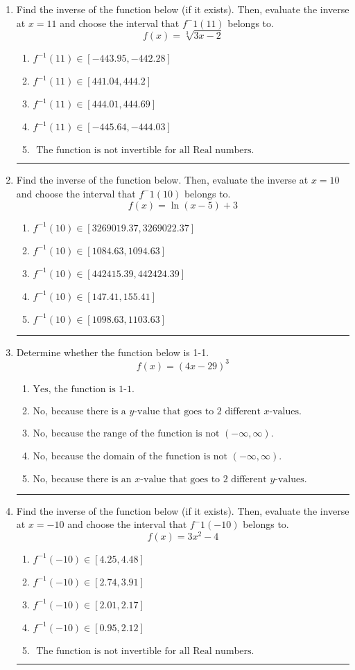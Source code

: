 \documentclass[14pt]{extbook}
\newcommand{\litem}[1]{\item#1\hspace*{-1cm}\rule{\textwidth}{0.4pt}}
\begin{document}
\begin{enumerate}
{\begin{enumerate}[label=\Alph*.]
\end{enumerate} }
\litem{
Find the inverse of the function below (if it exists). Then, evaluate the inverse at $x = 11$ and choose the interval that $f^-1(11)$ belongs to.\[ f(x) = \sqrt[3]{3 x - 2} \]\begin{enumerate}[label=\Alph*.]
\item \( f^{-1}(11) \in [-443.95, -442.28] \)
\item \( f^{-1}(11) \in [441.04, 444.2] \)
\item \( f^{-1}(11) \in [444.01, 444.69] \)
\item \( f^{-1}(11) \in [-445.64, -444.03] \)
\item \( \text{ The function is not invertible for all Real numbers. } \)

\end{enumerate} }
\litem{
Find the inverse of the function below. Then, evaluate the inverse at $x = 10$ and choose the interval that $f^-1(10)$ belongs to.\[ f(x) = \ln{(x-5)}+3 \]\begin{enumerate}[label=\Alph*.]
\item \( f^{-1}(10) \in [3269019.37, 3269022.37] \)
\item \( f^{-1}(10) \in [1084.63, 1094.63] \)
\item \( f^{-1}(10) \in [442415.39, 442424.39] \)
\item \( f^{-1}(10) \in [147.41, 155.41] \)
\item \( f^{-1}(10) \in [1098.63, 1103.63] \)

\end{enumerate} }
\litem{
Determine whether the function below is 1-1.\[ f(x) = (4 x - 29)^3 \]\begin{enumerate}[label=\Alph*.]
\item \( \text{Yes, the function is 1-1.} \)
\item \( \text{No, because there is a $y$-value that goes to 2 different $x$-values.} \)
\item \( \text{No, because the range of the function is not $(-\infty, \infty)$.} \)
\item \( \text{No, because the domain of the function is not $(-\infty, \infty)$.} \)
\item \( \text{No, because there is an $x$-value that goes to 2 different $y$-values.} \)

\end{enumerate} }
\litem{
Find the inverse of the function below (if it exists). Then, evaluate the inverse at $x = -10$ and choose the interval that $f^-1(-10)$ belongs to.\[ f(x) = 3 x^2 - 4 \]\begin{enumerate}[label=\Alph*.]
\item \( f^{-1}(-10) \in [4.25, 4.48] \)
\item \( f^{-1}(-10) \in [2.74, 3.91] \)
\item \( f^{-1}(-10) \in [2.01, 2.17] \)
\item \( f^{-1}(-10) \in [0.95, 2.12] \)
\item \( \text{ The function is not invertible for all Real numbers. } \)


\end{enumerate}}
\end{enumerate}
\end{document}
